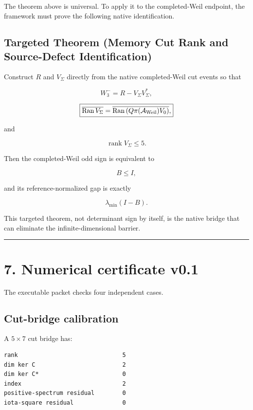 The theorem above is universal. To apply it to the completed-Weil endpoint,
the framework must prove the following native identification.

\hypertarget{targeted-theorem-memory-cut-rank-and-source-defect-identification}{%
\subsection{Targeted Theorem (Memory Cut Rank and Source-Defect Identification)}\label{targeted-theorem-memory-cut-rank-and-source-defect-identification}}

Construct \(R\) and \(V_\Sigma\) directly from the native completed-Weil cut
events so that

\[
\boxed{
W_3^-
=
R-V_\Sigma V_\Sigma^*,
}
\]

\[
\boxed{
\overline{\operatorname{Ran}V_\Sigma}
=
\overline{\operatorname{Ran}
\left(
Q\pi(\mathcal A_{\rm Weil})V_0
\right)},
}
\]

and

\[
\boxed{
\operatorname{rank}V_\Sigma\le5.
}
\]

Then the completed-Weil odd sign is equivalent to

\[
B\le I,
\]

and its reference-normalized gap is exactly

\[
\lambda_{\min}(I-B).
\]

This targeted theorem, not determinant sign by itself, is the native bridge
that can eliminate the infinite-dimensional barrier.

\begin{center}\rule{0.5\linewidth}{0.5pt}\end{center}

\hypertarget{numerical-certificate-v0.1}{%
\section{7. Numerical certificate v0.1}\label{numerical-certificate-v0.1}}

The executable packet checks four independent cases.

\hypertarget{cut-bridge-calibration}{%
\subsection{Cut-bridge calibration}\label{cut-bridge-calibration}}

A \(5\times7\) cut bridge has:

\begin{verbatim}
rank                              5
dim ker C                         2
dim ker C*                        0
index                             2
positive-spectrum residual        0
iota-square residual              0
\end{verbatim}

